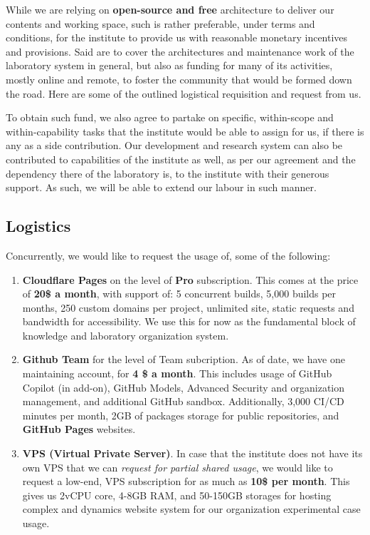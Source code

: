 \documentclass[10pt,a4paper]{article}
\begin{document}
While we are relying on \textbf{open-source and free} architecture to deliver our contents and working space, such is rather preferable, under terms and conditions, for the institute to provide us with reasonable monetary incentives and provisions. Said are to cover the architectures and maintenance work of the laboratory system in general, but also as funding for many of its activities, mostly online and remote, to foster the community that would be formed down the road. Here are some of the outlined logistical requisition and request from us. 

To obtain such fund, we also agree to partake on specific, within-scope and within-capability tasks that the institute would be able to assign for us, if there is any as a side contribution. Our development and research system can also be contributed to capabilities of the institute as well, as per our agreement and the dependency there of the laboratory is, to the institute with their generous support. As such, we will be able to extend our labour in such manner. 

\subsection{Logistics}

Concurrently, we would like to request the usage of, some of the following: 

\begin{enumerate}
    \item \textbf{Cloudflare Pages} on the level of \textbf{Pro} subscription. This comes at the price of \textbf{20\$ a month}, with support of: 5 concurrent builds, 5,000 builds per months, 250 custom domains per project, unlimited site, static requests and bandwidth for accessibility. We use this for now as the fundamental block of knowledge and laboratory organization system. 
    \item \textbf{Github Team} for the level of Team subcription. As of date, we have one maintaining account, for \textbf{4 \$ a month}. This includes usage of GitHub Copilot (in add-on), GitHub Models, Advanced Security and organization management, and additional GitHub sandbox. Additionally, 3,000 CI/CD minutes per month, 2GB of packages storage for public repositories, and \textbf{GitHub Pages} websites. 
    \item \textbf{VPS (Virtual Private Server)}. In case that the institute does not have its own VPS that we can \textit{request for partial shared usage}, we would like to request a low-end, VPS subscription for as much as \textbf{10\$ per month}. This gives us 2vCPU core, 4-8GB RAM, and 50-150GB storages for hosting complex and dynamics website system for our organization experimental case usage. 
\end{enumerate}
\end{document}
